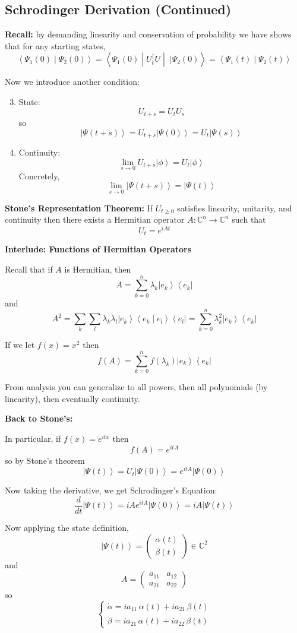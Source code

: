 \documentclass[12pt]{article}
\newcommand{\brak}[1]{\left\langle #1 \right\rangle}
\newcommand{\C}{\mathbb{C}}
\newcommand{\bra}[1]{\left\langle #1 \right\vert }
\newcommand{\ket}[1]{\left\vert #1 \right\rangle}
\begin{document}
\subsection*{Schrodinger Derivation (Continued)}
\textbf{Recall:} by demanding linearity and conservation of probability we have shows that for any starting states,
\[\brak{\Psi_1(0) \; | \; \Psi_2(0)} = \brak{\Psi_1(0) \; | \; U_t^\dagger U \; | \; \; | \Psi_2(0)} = \brak{\Psi_1(t) \; | \; \Psi_2(t)}\]

Now we introduce another condition:
\begin{enumerate}
    \setcounter{enumi}{2}
    \item State: 
    \[U_{t + s} = U_t U_s\]
    so 
    \[\ket{\Psi(t + s)} = U_{t + s} \ket{\Psi(0)} = U_t \ket{\Psi(s)}\]

    \item Continuity: 
    \[\lim_{s \to 0} U_{t+s} \ket \phi = U_t \ket \phi\]
    Concretely,
    \[\lim_{s\to 0} \ket{\Psi(t + s)} = \ket{\Psi(t)}\]
\end{enumerate}

\textbf{Stone's Representation Theorem:} If $U_{t\geq 0}$ satisfies linearity, unitarity, and continuity then there exists a Hermitian operator $A: \C^n \to \C^n$ such that 
\[U_t = e^{iAt}\]

\textbf{Interlude: Functions of Hermitian Operators}

Recall that if $A$ is Hermitian, then 
\[A = \sum_{k=0}^n \lambda_k \ket{e_k}\bra{e_k}\]
and 
\[A^2 = \sum_{k} \sum_{l} \lambda_k \lambda_l \ket{e_k} \brak{e_k \; | \; e_l}\bra{e_l} = \sum_{k=0}^n \lambda_k^2 \ket{e_k}\bra{e_k}\]

If we let $f(x) = x^2$ then 
\[f(A) = \sum_{k=0}^n f(\lambda_k) \ket{e_k}\bra{e_k}\]

From analysis you can generalize to all powers, then all polynomials (by linearity), then eventually continuity. 

\textbf{Back to Stone's:}

In particular, if $f(x) = e^{itx}$ then 
\[f(A) = e^{itA}\]
so by Stone's theorem
\[\ket{\Psi(t)} = U_t\ket{\Psi(0)} = e^{itA}\ket{\Psi(0)}\]

Now taking the derivative, we get Schrodinger's Equation:
\[\boxed{\frac{d}{dt}\ket{\Psi(t)} = iAe^{itA}\ket{\Psi(0)} = iA\ket{\Psi(t)}}\]

Now applying the state definition,
\[\ket{\Psi(t)} = \begin{pmatrix}
    \alpha(t)\\
    \beta(t)
\end{pmatrix} \in \C^2\]
and 
\[A = \begin{pmatrix}
    a_{11} & a_{12}\\
    a_{21} & a_{22}
\end{pmatrix}\]
so 
\[\begin{cases}
    \dot \alpha = ia_{11}\, \alpha(t) + ia_{21}\,\beta(t)\\
    \dot \beta = ia_{21}\, \alpha(t) + ia_{22}\,\beta(t)
\end{cases}\]
\end{document}

